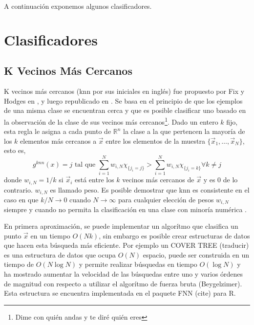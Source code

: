 \documentclass[letterpaper,12pt]{book}
\begin{document}
A continuación exponemos algunos clasificadores.

\section{Clasificadores}

\subsection{K Vecinos Más Cercanos}

K vecinos más cercanos (knn por sus iniciales en inglés) fue propuesto por Fix y Hodges en \cite{fix_discriminatory_1951}, y luego republicado en  \cite{silverman_e._1989}. Se basa en el principio de que los ejemplos de una misma clase se encuentran cerca y que es posible clasificar uno basado en la observación de la clase de sus vecinos más cercanos\footnote{Dime con quién andas y te diré quién eres}. Dado un entero $k$ fijo, esta regla le asigna a cada punto de $\mathbb{R}^n$ la clase a la que pertencen la mayoría de los $k$ elementos más cercanos a $\vec{x}$ entre los elementos de la muestra $\{\vec{x}_1, \dots,\vec{x}_N\}$, esto es,
\begin{equation}\label{eq:knnRule}
 g^{knn}(x) = j  \text{ tal que } \sum_{i=1}^{N}w_{i,N}\chi_{\{j_i = j\}} > \sum_{i=1}^{N}w_{i,N}\chi_{\{j_i = k\}}\forall k\neq j
\end{equation} 
donde $w_{i,N} = 1/k$ si $\vec{x}_i$ está entre los $k$ vecinos más cercanos de $\vec{x}$ y es $0$ de lo contrario. $w_{i,N}$ es llamado peso. Es posible demostrar que knn es consistente en el caso en que $k/N\to 0$ cuando $N\to \infty$ para cualquier elección de pesos $w_{i,N}$ siempre y cuando no permita la clasificación en una clase con minoría numérica \cite{devroye_probabilistic_1996}.

En primera aproximación, se puede implementar un algorítmo que clasifica un punto $\vec{x}$ en un tiempo $O(Nk)$, sin embargo es posible crear estructuras de datos que hacen esta búsqueda más eficiente. Por ejemplo un COVER TREE (traducir)\cite{beygelzimer_cover_2006} es una estructura de datos que ocupa $O(N)$ espacio, puede ser construida en un tiempo de $O(N\log{N})$ y permite realizar búsquedas en tiempo $O(\log{N})$ y ha mostrado aumentar la velocidad de las búsquedas entre uno y varios órdenes de magnitud con respecto a utilizar el algorítmo de fuerza bruta (Beygelzimer). Esta estructura se encuentra implementada en el paquete FNN (cite) para R.
\end{document}
